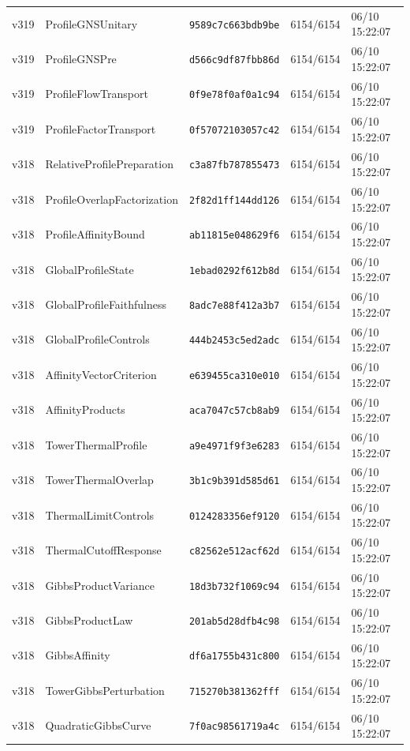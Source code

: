 \documentclass[11pt]{article}
\theoremstyle{definition}\newtheorem{deriv}{Derivation}
\begin{document}
{\begin{longtable}{@{}lllll@{}}
v319 & ProfileGNSUnitary & \texttt{9589c7c663bdb9be} & 6154/6154 & 06/10 15:22:07 \\
v319 & ProfileGNSPre & \texttt{d566c9df87fbb86d} & 6154/6154 & 06/10 15:22:07 \\
v319 & ProfileFlowTransport & \texttt{0f9e78f0af0a1c94} & 6154/6154 & 06/10 15:22:07 \\
v319 & ProfileFactorTransport & \texttt{0f57072103057c42} & 6154/6154 & 06/10 15:22:07 \\
v318 & RelativeProfilePreparation & \texttt{c3a87fb787855473} & 6154/6154 & 06/10 15:22:07 \\
v318 & ProfileOverlapFactorization & \texttt{2f82d1ff144dd126} & 6154/6154 & 06/10 15:22:07 \\
v318 & ProfileAffinityBound & \texttt{ab11815e048629f6} & 6154/6154 & 06/10 15:22:07 \\
v318 & GlobalProfileState & \texttt{1ebad0292f612b8d} & 6154/6154 & 06/10 15:22:07 \\
v318 & GlobalProfileFaithfulness & \texttt{8adc7e88f412a3b7} & 6154/6154 & 06/10 15:22:07 \\
v318 & GlobalProfileControls & \texttt{444b2453c5ed2adc} & 6154/6154 & 06/10 15:22:07 \\
v318 & AffinityVectorCriterion & \texttt{e639455ca310e010} & 6154/6154 & 06/10 15:22:07 \\
v318 & AffinityProducts & \texttt{aca7047c57cb8ab9} & 6154/6154 & 06/10 15:22:07 \\
v318 & TowerThermalProfile & \texttt{a9e4971f9f3e6283} & 6154/6154 & 06/10 15:22:07 \\
v318 & TowerThermalOverlap & \texttt{3b1c9b391d585d61} & 6154/6154 & 06/10 15:22:07 \\
v318 & ThermalLimitControls & \texttt{0124283356ef9120} & 6154/6154 & 06/10 15:22:07 \\
v318 & ThermalCutoffResponse & \texttt{c82562e512acf62d} & 6154/6154 & 06/10 15:22:07 \\
v318 & GibbsProductVariance & \texttt{18d3b732f1069c94} & 6154/6154 & 06/10 15:22:07 \\
v318 & GibbsProductLaw & \texttt{201ab5d28dfb4c98} & 6154/6154 & 06/10 15:22:07 \\
v318 & GibbsAffinity & \texttt{df6a1755b431c800} & 6154/6154 & 06/10 15:22:07 \\
v318 & TowerGibbsPerturbation & \texttt{715270b381362fff} & 6154/6154 & 06/10 15:22:07 \\
v318 & QuadraticGibbsCurve & \texttt{7f0ac98561719a4c} & 6154/6154 & 06/10 15:22:07 \\

\end{longtable}}
\end{document}
